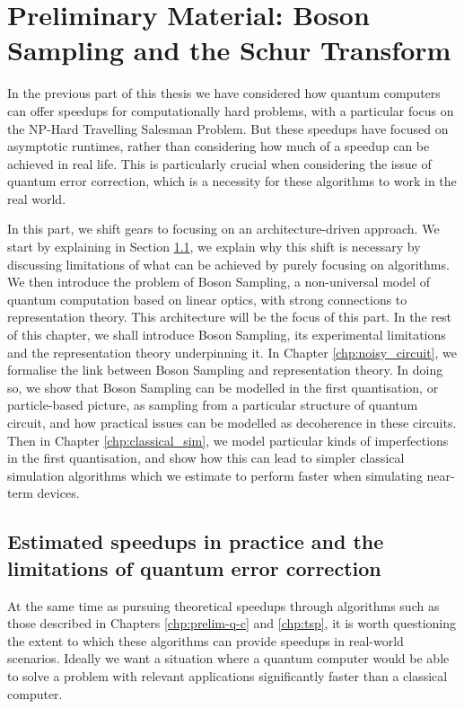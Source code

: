 \chapter{Preliminary Material: Boson Sampling and the Schur Transform}

In the previous part of this thesis we have considered how quantum computers can offer speedups for computationally hard problems, with a particular focus on the NP-Hard Travelling Salesman Problem. But these speedups have focused on asymptotic runtimes, rather than considering how much of a speedup can be achieved in real life. This is particularly crucial when considering the issue of quantum error correction, which is a necessity for these algorithms to work in the real world.

In this part, we shift gears to focusing on an architecture-driven approach. We start by explaining in Section \ref{sec:error-correction}, we explain why this shift is necessary by discussing limitations of what can be achieved by purely focusing on algorithms. We then introduce the problem of Boson Sampling, a non-universal model of quantum computation based on linear optics, with strong connections to representation theory. This architecture will be the focus of this part. In the rest of this chapter, we shall introduce Boson Sampling, its experimental limitations and the representation theory underpinning it. In Chapter \ref{chp:noisy_circuit}, we formalise the link between Boson Sampling and representation theory. In doing so, we show that Boson Sampling can be modelled in the first quantisation, or particle-based picture, as sampling from a particular structure of quantum circuit, and how practical issues can be modelled as decoherence in these circuits. Then in Chapter \ref{chp:classical_sim}, we model particular kinds of imperfections in the first quantisation, and show how this can lead to simpler classical simulation algorithms which we estimate to perform faster when simulating near-term devices.

\section{Estimated speedups in practice and the limitations of quantum error correction}
\label{sec:error-correction}

At the same time as pursuing theoretical speedups through algorithms such as those described in Chapters \ref{chp:prelim-q-c} and \ref{chp:tsp}, it is worth questioning the extent to which these algorithms can provide speedups in real-world scenarios. Ideally we want a situation where a quantum computer would be able to solve a problem with relevant applications significantly faster than a classical computer.

